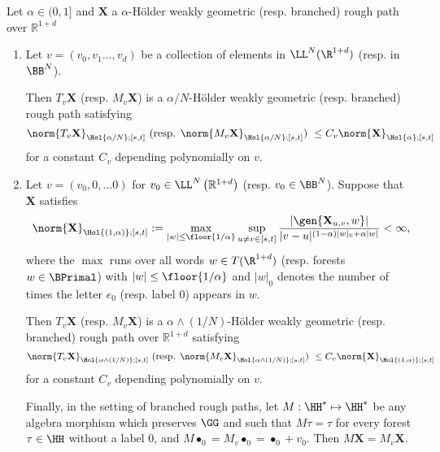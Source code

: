 \documentclass{article}
\begin{document}
\begin{theorem}\label{thm:transRPs}

Let $\alpha \in (0,1]$ and $\mathbf{X}$ a $\alpha$-H{\"older} weakly geometric (resp. branched) rough path over $\mathbb{R}^{1+d}$

\begin{enumerate}[label=\upshape(\roman*\upshape)]
\item \label{point:trans1} Let $v = \left(v_{0},v_1\ldots, v_d \right)$ be a collection of elements in $\LL^N(\R^{1+d})$ (resp. in $\BB^N$).

Then $T_v\mathbf{X}$ (resp. $M_v \mathbf{X}$) is a $\alpha/N$-H{\"older} weakly geometric (resp. branched) rough path satisfying
\begin{equation}\label{eq:HolLipNorm}
\norm{T_v\mathbf{X}}_{\Hol{\alpha/N};[s,t]} \textnormal{ (resp. $\norm{M_v\mathbf{X}}_{\Hol{\alpha/N};[s,t]}$) } \leq C_v \norm{\mathbf{X}}_{\Hol{\alpha};[s,t]}
\end{equation}
for a constant $C_v$ depending polynomially on $v$.

\item \label{point:trans2} Let $v= \left( v_{0},0,\dots 0\right)$ for $v_{0}\in \LL^{N}\left( \mathbb{R}^{1+d}\right) $ (resp. $v_{0}\in \BB^N$). Suppose that $\mathbf{X}$ satisfies
\begin{equation}\label{eq:mixedVar}
\norm{\mathbf{X}}_{\Hol{(1,\alpha)};[s,t]} := \max_{|w| \leq \floor{1/\alpha}} \sup_{u \neq v \in [s,t]} \frac{|\gen{\mathbf{X}_{u,v}, w}|}{|v-u|^{(1-\alpha)|w|_0 + \alpha|w|}} < \infty,
\end{equation}
where the $\max$ runs over all words $w \in T(\R^{1+d})$ (resp. forests $w \in \BPrimal$) with $|w| \leq \floor{1/\alpha}$ and $|w|_0$ denotes the number of times the letter $e_0$ (resp. label $0$) appears in $w$.

Then $T_{v}\mathbf{X}$ (resp. $M_v\mathbf{X}$) is a $\alpha \wedge (1/N)$-H{\"older} weakly geometric (resp. branched) rough path over $\mathbb{R}^{1+d}$ satisfying
\[
\norm{T_v\mathbf{X}}_{\Hol{\alpha \wedge (1/N)};[s,t]} \textnormal{ (resp. $\norm{M_v\mathbf{X}}_{\Hol{\alpha \wedge (1/N)};[s,t]}$) } \leq C_v \norm{\mathbf{X}}_{\Hol{(1,\alpha)};[s,t]}
\]
for a constant $C_v$ depending polynomially on $v$.

Finally, in the setting of branched rough paths, let $M : \HH^* \mapsto \HH^*$ be any algebra morphism which preserves $\GG$ and such that $M \tau = \tau$ for every forest $\tau\in \HH$ without a label $0$, and $M\bullet_0 = M_v\bullet_0 = \bullet_0 + v_0$. Then $M \mathbf{X} = M_v \mathbf{X}$.
\end{enumerate} 
\end{theorem}
\end{document}
